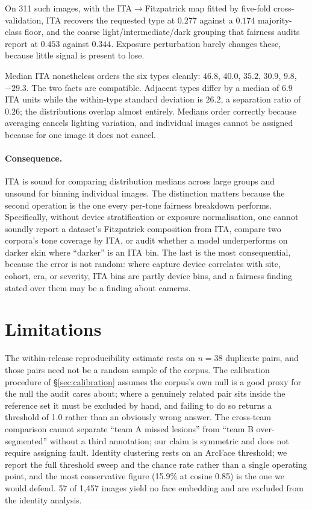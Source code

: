 \documentclass[11pt]{article}
\begin{document}
On 311 such images, with the ITA$\rightarrow$Fitzpatrick map fitted by five-fold
cross-validation, ITA recovers the requested type at $0.277$ against a $0.174$
majority-class floor, and the coarse light/intermediate/dark grouping that fairness audits
report at $0.453$ against $0.344$. Exposure perturbation barely changes these, because
little signal is present to lose.

Median ITA nonetheless orders the six types cleanly: $46.8$, $40.0$, $35.2$, $30.9$, $9.8$,
$-29.3$. The two facts are compatible. Adjacent types differ by a median of $6.9$ ITA units
while the within-type standard deviation is $26.2$, a separation ratio of $0.26$; the
distributions overlap almost entirely. Medians order correctly because averaging cancels
lighting variation, and individual images cannot be assigned because for one image it does
not cancel.

\paragraph{Consequence.} ITA is sound for comparing distribution medians across large
groups and unsound for binning individual images. The distinction matters because the
second operation is the one every per-tone fairness breakdown performs. Specifically,
without device stratification or exposure normalisation, one cannot soundly report a
dataset's Fitzpatrick composition from ITA, compare two corpora's tone coverage by ITA, or
audit whether a model underperforms on darker skin where ``darker'' is an ITA bin. The last
is the most consequential, because the error is not random: where capture device correlates
with site, cohort, era, or severity, ITA bins are partly device bins, and a fairness finding
stated over them may be a finding about cameras.

\section{Limitations}

The within-release reproducibility estimate rests on $n=38$ duplicate pairs, and those
pairs need not be a random sample of the corpus. The calibration procedure of
\S\ref{sec:calibration} assumes the corpus's own null is a good proxy for the null the
audit cares about; where a genuinely related pair sits inside the reference set it must be
excluded by hand, and failing to do so returns a threshold of 1.0 rather than an obviously
wrong answer. The cross-team comparison cannot
separate ``team A missed lesions'' from ``team B over-segmented'' without a third
annotation; our claim is symmetric and does not require assigning fault. Identity
clustering rests on an ArcFace threshold; we report the full threshold sweep and the
chance rate rather than a single operating point, and the most conservative figure
(15.9\% at cosine 0.85) is the one we would defend. 57 of 1{,}457 images yield no face
embedding and are excluded from the identity analysis.
\end{document}

